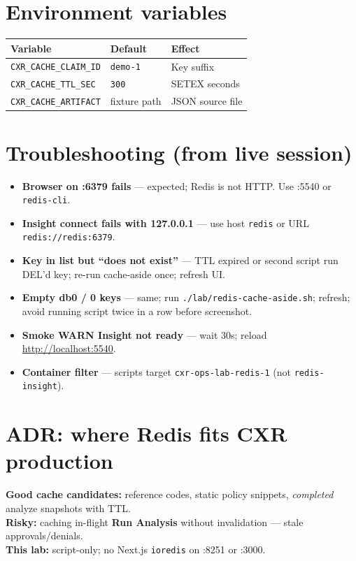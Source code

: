 \documentclass[11pt,a4paper]{report}
\begin{document}
\chapter{Environment variables}

\begin{center}
\begin{tabular}{lll}
\toprule
Variable & Default & Effect \\
\midrule
\texttt{CXR\_CACHE\_CLAIM\_ID} & \texttt{demo-1} & Key suffix \\
\texttt{CXR\_CACHE\_TTL\_SEC} & \texttt{300} & SETEX seconds \\
\texttt{CXR\_CACHE\_ARTIFACT} & fixture path & JSON source file \\
\bottomrule
\end{tabular}
\end{center}

\chapter{Troubleshooting (from live session)}

\begin{itemize}
  \item \textbf{Browser on :6379 fails} --- expected; Redis is not HTTP. Use :5540 or \texttt{redis-cli}.
  \item \textbf{Insight connect fails with 127.0.0.1} --- use host \texttt{redis} or URL \texttt{redis://redis:6379}.
  \item \textbf{Key in list but ``does not exist''} --- TTL expired or second script run DEL'd key; re-run cache-aside once; refresh UI.
  \item \textbf{Empty db0 / 0 keys} --- same; run \texttt{./lab/redis-cache-aside.sh}; refresh; avoid running script twice in a row before screenshot.
  \item \textbf{Smoke WARN Insight not ready} --- wait 30s; reload \url{http://localhost:5540}.
  \item \textbf{Container filter} --- scripts target \texttt{cxr-ops-lab-redis-1} (not \texttt{redis-insight}).
\end{itemize}

\chapter{ADR: where Redis fits CXR production}

\textbf{Good cache candidates:} reference codes, static policy snippets, \emph{completed} analyze snapshots with TTL.\\
\textbf{Risky:} caching in-flight \textbf{Run Analysis} without invalidation --- stale approvals/denials.\\
\textbf{This lab:} script-only; no Next.js \texttt{ioredis} on :8251 or :3000.
\end{document}
